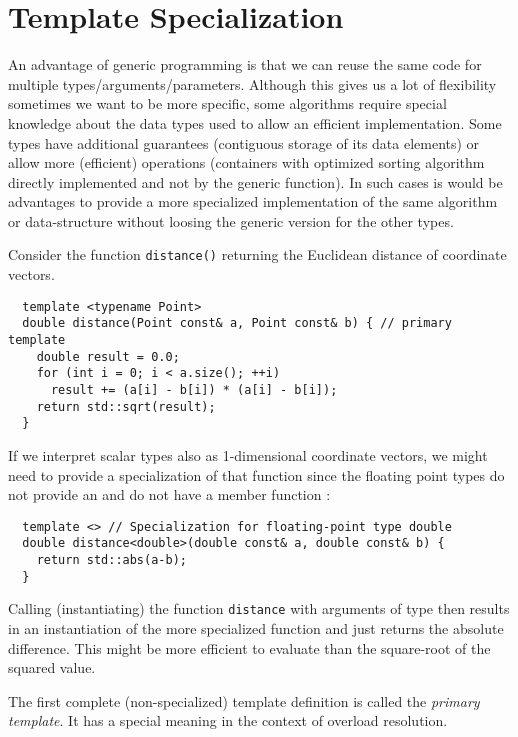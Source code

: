\chapter{Template Specialization}
An advantage of generic programming is that we can reuse the same code for multiple types/arguments/parameters. Although this gives us a lot of flexibility
sometimes we want to be more specific, \ie some algorithms require special knowledge about the data types used to allow an efficient implementation. Some
types have additional guarantees (\eg contiguous storage of its data elements) or allow more (efficient) operations (\eg containers with optimized sorting
algorithm directly implemented and not by the generic  function). In such cases is would be advantages to provide a more specialized implementation
of the same algorithm or data-structure without loosing the generic version for the other types.

\begin{example}
  Consider the function \texttt{distance()} returning the Euclidean distance of coordinate vectors.
  \begin{verbatim}
  template <typename Point>
  double distance(Point const& a, Point const& b) { // primary template
    double result = 0.0;
    for (int i = 0; i < a.size(); ++i)
      result += (a[i] - b[i]) * (a[i] - b[i]);
    return std::sqrt(result);
  }
  \end{verbatim}
  If we interpret scalar types also as 1-dimensional coordinate vectors, we might need to provide a specialization of that function
  since the floating point types do not provide an  and do not have a member function :
  \begin{verbatim}
  template <> // Specialization for floating-point type double
  double distance<double>(double const& a, double const& b) {
    return std::abs(a-b);
  }
  \end{verbatim}
  Calling (instantiating) the function \texttt{distance} with arguments of type  then results in an instantiation of the more specialized
  function and just returns the absolute difference. This might be more efficient to evaluate than the square-root of the squared value.
\end{example}

\begin{defn}
  The first complete (non-specialized) template definition is called the \emph{primary template}. It has a special meaning in the context of overload resolution.
\end{defn}

